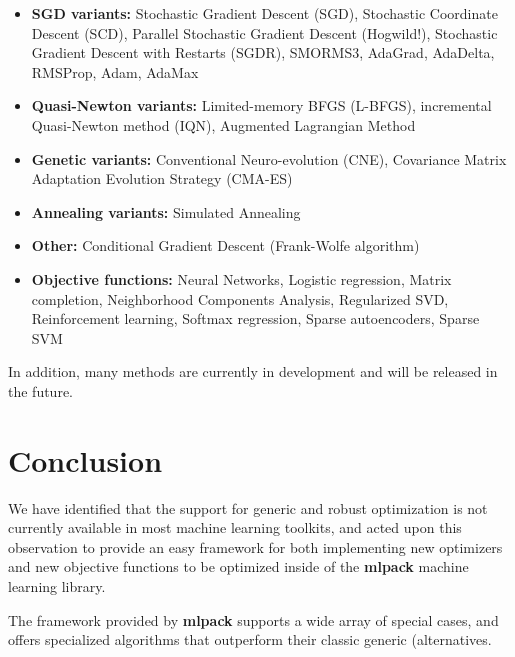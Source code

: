 \documentclass{article}
\begin{document}
\begin{itemize}
  \item {\bf SGD variants:} Stochastic Gradient Descent (SGD), Stochastic
      Coordinate Descent (SCD), Parallel Stochastic Gradient Descent (Hogwild!),
      Stochastic Gradient Descent with Restarts (SGDR), SMORMS3, AdaGrad,
      AdaDelta, RMSProp, Adam, AdaMax

  \item {\bf Quasi-Newton variants:} Limited-memory BFGS (L-BFGS), incremental
        Quasi-Newton method (IQN), Augmented Lagrangian Method

  \item {\bf Genetic variants:} Conventional Neuro-evolution (CNE), Covariance
        Matrix Adaptation Evolution Strategy (CMA-ES)

  \item {\bf Annealing variants:} Simulated Annealing

  \item {\bf Other:} Conditional Gradient Descent (Frank-Wolfe algorithm)

  \item {\bf Objective functions:} Neural Networks, Logistic regression,
      Matrix completion, Neighborhood Components Analysis, Regularized SVD,
      Reinforcement learning, Softmax regression, Sparse autoencoders,
      Sparse SVM
\end{itemize}

In addition, many methods are currently in development and will be released in
the future.

\section{Conclusion}

We have identified that the support for generic and robust optimization is not
currently available in most machine learning toolkits, and acted upon this
observation to provide an easy framework for both implementing new optimizers
and new objective functions to be optimized inside of the {\bf mlpack} machine
learning library.

The framework provided by {\bf mlpack} supports a wide array of special cases,
and offers specialized algorithms that outperform their classic generic
 (alternatives.



\end{document}
